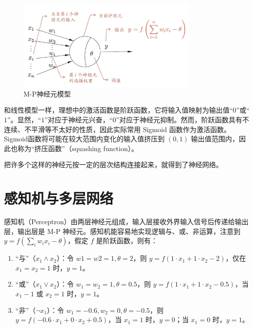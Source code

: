 \documentclass[12pt, a4paper]{article} %
\begin{document}
\begin{figure}[H]
    \centering
    \includegraphics[width=0.8\textwidth]{../img/5-2-M-P神经元模型.png}
    \caption{M-P神经元模型}
    \label{fig:M-P神经元模型}
\end{figure}

和线性模型一样，理想中的激活函数是阶跃函数，它将输入值映射为输出值“$0$”或“$1$”。显然，“$1$”对应于神经元兴奋，“$0$”对应于神经元抑制。然而，阶跃函数具有不连续、不平滑等不太好的性质，因此实际常用 Sigmoid 函数作为激活函数。Sigmoid函数将可能在较大范围内变化的输入值挤压到 $(0, 1)$ 输出值范围内，因此也称为“挤压函数”（squashing function）。

把许多个这样的神经元按一定的层次结构连接起来，就得到了神经网络。



\section{感知机与多层网络}

感知机（Perceptron）由两层神经元组成，输入层接收外界输入信号后传递给输出层，输出层是 M-P 神经元。感知机能容易地实现逻辑与、或、非运算，注意到 $\displaystyle y = f( \sum_i w_i x_i - \theta)$，假定 $f$ 是阶跃函数，则有：

\begin{enumerate}[\hspace*{2em} i.]
    \item “与”（$x_1 \wedge x_2$）：令 $w1 = w2 = 1, \theta = 2$，则 $y = f(1 \cdot x_1 + 1 \cdot x_2 - 2)$，仅在 $x_1 = x_2 = 1$ 时，$y = 1$。
    \item “或”（$x_1 \vee x_2$）：令 $w_1 = w_2 = 1, \theta = 0.5$，则 $y = f(1 \cdot x_1 + 1 \cdot x_2 - 0.5)$，当 $x_1 - 1$ 或 $x_2 = 1$ 时，$y = 1$。
    \item “非”（$\neg x_1$）：令 $w_1 = -0.6, w_2 = 0, \theta = - 0.5$，则 $y = f(-0.6 \cdot x_1 + 0 \cdot x_2 + 0.5)$，当 $x_1 = 1$ 时，$y = 0$；当 $x_1 = 0$ 时，$y = 1$。
\end{enumerate}
\end{document}
